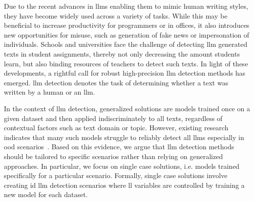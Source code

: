 Due to the recent advances in \acp{llm} enabling them to mimic human writing styles, they have become widely used across a variety of tasks.
While this may be beneficial to increase productivity for programmers or in offices, it also introduces new opportunities for misuse, such as generation of fake news or impersonation of individuals.
Schools and universities face the challenge of detecting \ac{llm} generated texts in student assignments, thereby not only decreasing the amount students learn, but also binding resources of teachers to detect such texts.
In light of these developments, a rightful call for robust high-precision \ac{llm} detection methods has emerged.
\ac{llm} detection denotes the task of determining whether a text was written by a human or an \ac{llm}.

In the context of \ac{llm} detection, generalized solutions are models trained once on a given dataset and then applied indiscriminately to all texts, regardless of contextual factors such as text domain or topic. 
However, existing research indicates that many such models struggle to reliably detect all \acp{llm} especially in \ac{ood} scenarios~\citep{bhattacharjee_fighting_2024,li_learning_2025}.
Based on this evidence, we argue that \ac{llm} detection methods should be tailored to specific scenarios rather than relying on generalized approaches.
In particular, we focus on single case solutions, i.e. models trained specifically for a particular scenario.
Formally, single case solutions involve creating \ac{id} \ac{llm} detection scenarios where ll variables are controlled by training a new model for each dataset.

